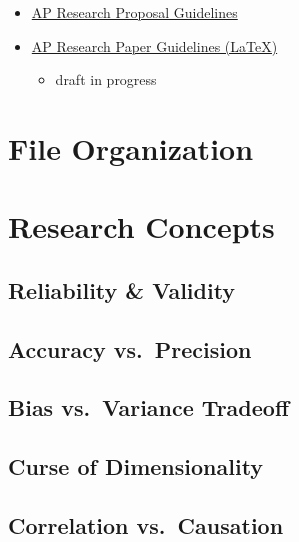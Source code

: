 \documentclass[]{book}
\providecommand{\tightlist}{%
  \setlength{\itemsep}{0pt}\setlength{\parskip}{0pt}}
\begin{document}
\begin{itemize}
\tightlist
\item
  \href{https://www.overleaf.com/read/ncvzdvcvfxdx}{AP Research Proposal Guidelines}
\item
  \href{https://www.overleaf.com/read/hxctjpdnvffw}{AP Research Paper Guidelines (LaTeX)}

  \begin{itemize}
  \tightlist
  \item
    draft in progress
  \end{itemize}
\end{itemize}

\hypertarget{file-organization}{%
\chapter{File Organization}\label{file-organization}}

\hypertarget{research-concepts}{%
\chapter{Research Concepts}\label{research-concepts}}

\hypertarget{reliability-validity}{%
\section{Reliability \& Validity}\label{reliability-validity}}

\hypertarget{accuracy-vs.-precision}{%
\section{Accuracy vs.~Precision}\label{accuracy-vs.-precision}}

\hypertarget{bias-vs.-variance-tradeoff}{%
\section{Bias vs.~Variance Tradeoff}\label{bias-vs.-variance-tradeoff}}

\hypertarget{curse-of-dimensionality}{%
\section{Curse of Dimensionality}\label{curse-of-dimensionality}}

\hypertarget{correlation-vs.-causation}{%
\section{Correlation vs.~Causation}\label{correlation-vs.-causation}}
\end{document}
